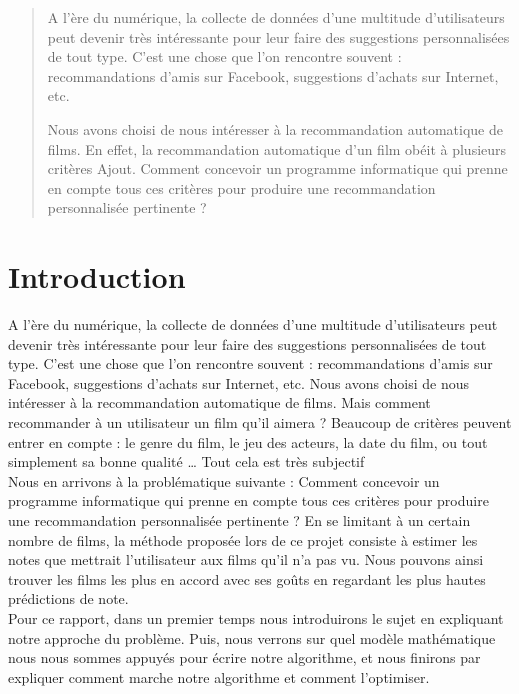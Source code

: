 \documentclass[a4paper,10pt]{article}
\title{}
\author{}
\begin{document}
\maketitle

\begin{abstract}
A l’ère du numérique, la collecte de données d’une multitude d’utilisateurs peut devenir très intéressante pour leur faire des suggestions personnalisées de tout type. C’est une chose que l'on rencontre souvent : recommandations d’amis sur Facebook, suggestions d’achats sur Internet, etc.

Nous avons choisi de nous intéresser à la recommandation automatique de films. En effet, la recommandation automatique d’un film obéit à plusieurs critères Ajout. Comment concevoir un programme informatique qui prenne en compte tous ces critères pour produire une recommandation personnalisée pertinente ?

\end{abstract}

\section*{Introduction}
A l’ère du numérique, la collecte de données d’une multitude d’utilisateurs peut devenir très intéressante pour leur faire des suggestions 
personnalisées de tout type. C’est une chose que l’on rencontre souvent : recommandations d’amis sur Facebook, suggestions d’achats sur Internet, etc.
Nous avons choisi de nous intéresser à la recommandation automatique de films.
Mais comment recommander à un utilisateur un film qu’il aimera ? Beaucoup de critères peuvent entrer en compte : 
le genre du film, le jeu des acteurs, la date du film, ou tout simplement sa bonne qualité … Tout cela est très subjectif \! \\


Nous en arrivons à la problématique suivante : Comment concevoir un programme informatique 
qui prenne en compte tous ces critères pour produire une recommandation personnalisée pertinente ?
En se limitant à un certain nombre de films, la méthode proposée lors de ce projet consiste à estimer les notes que mettrait l’utilisateur aux films qu'il n'a pas vu.
Nous pouvons ainsi trouver les films les plus en accord avec ses goûts en regardant les plus hautes prédictions de note.\\
Pour ce rapport, dans un premier temps nous introduirons le sujet en expliquant notre approche du problème.
Puis, nous verrons sur quel modèle mathématique nous nous sommes appuyés pour écrire notre algorithme, et nous finirons par expliquer comment marche notre algorithme et comment l’optimiser.
\end{document}

